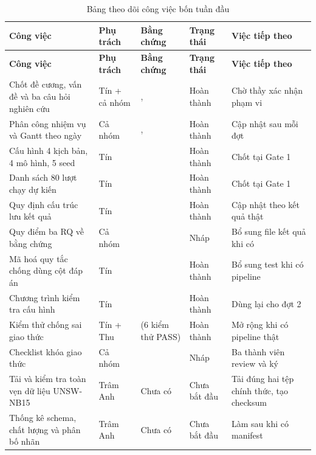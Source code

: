 \documentclass[12pt,a4paper,oneside]{article}
\begin{document}
\small
\renewcommand{\arraystretch}{1.2}
\setlength{\tabcolsep}{4pt}
\noindent\begin{longtable}{L{3.5cm}L{2.1cm}L{4.0cm}L{1.9cm}L{2.9cm}}
\caption{Bảng theo dõi công việc bốn tuần đầu}\label{tab:worklog}\\
\toprule\textbf{Công việc} & \textbf{Phụ trách} & \textbf{Bằng chứng} & \textbf{Trạng thái} & \textbf{Việc tiếp theo}\\
\midrule\endfirsthead
\toprule\textbf{Công việc} & \textbf{Phụ trách} & \textbf{Bằng chứng} & \textbf{Trạng thái} & \textbf{Việc tiếp theo}\\
\midrule\endhead\bottomrule\endfoot
Chốt đề cương, vấn đề và ba câu hỏi nghiên cứu & Tín + cả nhóm & ,  & Hoàn thành & Chờ thầy xác nhận phạm vi\\
Phân công nhiệm vụ và Gantt theo ngày & Cả nhóm & ,  & Hoàn thành & Cập nhật sau mỗi đợt\\
Cấu hình 4 kịch bản, 4 mô hình, 5 seed & Tín &  & Hoàn thành & Chốt tại Gate 1\\
Danh sách 80 lượt chạy dự kiến & Tín &  & Hoàn thành & Chốt tại Gate 1\\
Quy định cấu trúc lưu kết quả & Tín &  & Hoàn thành & Cập nhật theo kết quả thật\\
Quy điểm ba RQ về bằng chứng & Cả nhóm &  & Nháp & Bổ sung file kết quả khi có\\
Mã hoá quy tắc chống dùng cột đáp án & Tín &  & Hoàn thành & Bổ sung test khi có pipeline\\
Chương trình kiểm tra cấu hình & Tín &  & Hoàn thành & Dùng lại cho đợt 2\\
Kiểm thử chống sai giao thức & Tín + Thu &  (6 kiểm thử PASS) & Hoàn thành & Mở rộng khi có pipeline thật\\
Checklist khóa giao thức & Cả nhóm &  & Nháp & Ba thành viên review và ký\\
Tải và kiểm tra toàn vẹn dữ liệu UNSW-NB15 & Trâm Anh & Chưa có & Chưa bắt đầu & Tải đúng hai tệp chính thức, tạo checksum\\
Thống kê schema, chất lượng và phân bố nhãn & Trâm Anh & Chưa có & Chưa bắt đầu & Làm sau khi có manifest\\

\end{longtable}
\end{document}
